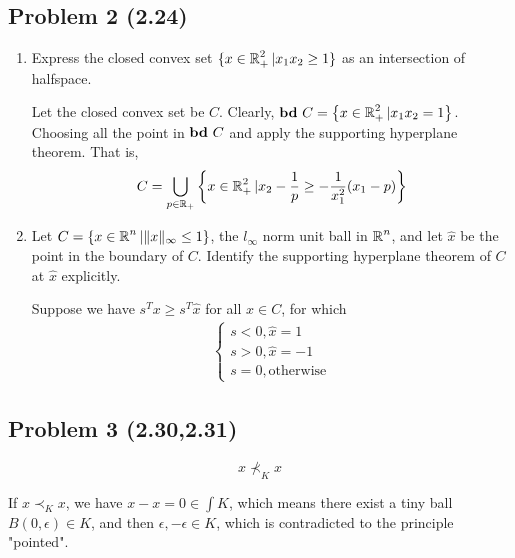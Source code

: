 \documentclass[en,hazy,blue,12pt,device = pad]{elegantnote}
\begin{document}
\subsection*{Problem 2 (2.24)}
\begin{enumerate}[{ (a)}]
    \item Express the closed convex set \(\{x \in \operatorname{\mathbb R}_+^2 | x_1 x_2 \geq 1 \}\) as an intersection of halfspace.
    \begin{tcolorbox}
        \sol

        Let the closed convex set be \(C\). Clearly, \({\textbf{bd}\ } C = \left\{ x \in \operatorname{\mathbb R}_+^2 | x_1 x_2 = 1 \right\}\). Choosing all the point in \({\textbf{bd}\ } C\) and apply the supporting hyperplane theorem. That is, 
        \[C = \bigcup _{p \in \operatorname{\mathbb R}_+} \left\{x\in \operatorname{\mathbb R}_+^2 | x_2 - \frac 1 p \geq - \frac{1}{x_1^2}( x_1 - p)\right\}\]

    \end{tcolorbox}
    \item Let \(C = \left\{x \in \operatorname{\mathbb R}^n | \Vert x \Vert _\infty  \leq 1\right\}\), the \(l _\infty\) norm unit ball in \(\operatorname{\mathbb R}^n\), and let \(\hat x\) be the point in the boundary of \(C\). Identify the supporting hyperplane theorem of \(C\) at \(\hat x\) explicitly.
    \begin{tcolorbox}
        \sol

        Suppose we have \(s^T x \geq s^T \hat x\) for all \(x \in C\), for which
        \begin{align*}
            \begin{cases}
                s < 0, \hat x = 1 \\
                s > 0, \hat x = -1 \\
                s = 0, \text{otherwise}
            \end{cases}
        \end{align*}
    \end{tcolorbox}

\end{enumerate}

\subsection*{Problem 3 (2.30,2.31)}
\vspace*{-2em}
{\large \[x\nprec_K x\]}
\vspace{-1em}
\begin{tcolorbox}
    \pf

    If \(x\prec_K x\), we have \(x - x = 0 \in \int K\), which means there exist a tiny ball \(B(0,\epsilon) \in K\), and then \(\epsilon,-\epsilon \in K\), which is contradicted to the principle "pointed".
\end{tcolorbox}
\end{document}
